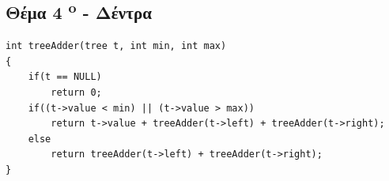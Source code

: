\documentclass[a4paper,10pt]{article}
\begin{document}

\subsection{Θέμα 4 \textsuperscript{o} - Δέντρα}

\begin{verbatim}
int treeAdder(tree t, int min, int max)
{
    if(t == NULL)
        return 0;
    if((t->value < min) || (t->value > max))
        return t->value + treeAdder(t->left) + treeAdder(t->right);
    else
        return treeAdder(t->left) + treeAdder(t->right);
}
\end{verbatim}
\end{document}
